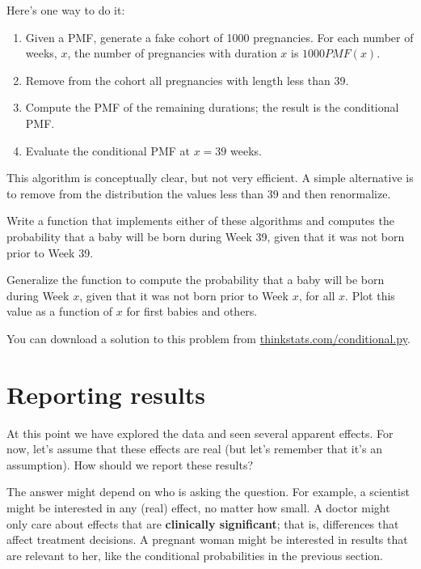 \documentclass[12pt]{book}
\begin{document}
Here's one way to do it:

\begin{enumerate}

\item Given a PMF, generate a fake cohort of 1000 pregnancies.
For each number of weeks, $x$, the number of pregnancies with
duration $x$ is $1000 PMF(x)$.

\item Remove from the cohort all pregnancies with length less than 39.

\item Compute the PMF of the remaining durations; the result is the
conditional PMF.

\item Evaluate the conditional PMF at $x = 39$ weeks.

\end{enumerate}

This algorithm is conceptually clear, but not very efficient.
A simple alternative is to remove from the distribution the values
less than 39 and then renormalize.

\begin{ex}

Write a function that implements either of these algorithms and
computes the probability that a baby will be born during Week 39,
given that it was not born prior to Week 39.

Generalize the function to compute the
probability that a baby will be born during Week $x$, given that
it was not born prior to Week $x$, for all $x$.
Plot this value as a function of $x$ for first babies and others.

You can download a solution to this problem from
\url{thinkstats.com/conditional.py}.

\end{ex}


\section{Reporting results}

At this point we have explored the data and seen several apparent
effects.  For now, let's assume that these effects are real (but let's
remember that it's an assumption).  How should we report these
results?

The answer might depend on who is asking the question.  For example, a
scientist might be interested in any (real) effect, no matter how
small.  A doctor might only care about effects that are {\bf
  clinically significant}; that is, differences that affect treatment
decisions.  A pregnant woman might be interested in results that are
relevant to her, like the conditional probabilities in the previous
section.
\end{document}
